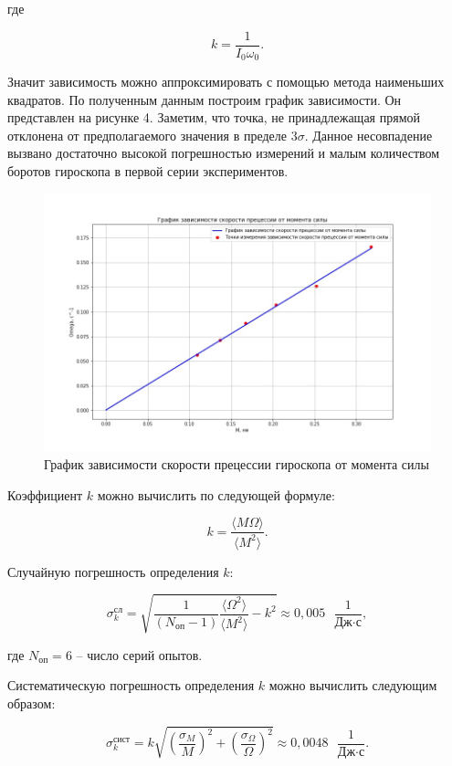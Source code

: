    где
    
\[
k = \frac{1}{I_0\omega_0}.
\]

    Значит зависимость можно аппроксимировать с помощью метода наименьших квадратов. По полученным данным построим график зависимости. Он представлен на рисунке 4. Заметим, что точка, не принадлежащая прямой отклонена от предполагаемого значения в пределе 3$\sigma$. Данное несовпадение вызвано достаточно высокой погрешностью измерений и малым количеством боротов гироскопа в первой серии экспериментов.

\begin{figure}[H]
	\includegraphics[scale = 0.45]{omegaM.jpg}
	\caption{График зависимости скорости прецессии гироскопа от момента силы}
	\label{graph}
\end{figure}

    Коэффициент $ k $ можно вычислить по следующей формуле:\label{k}

\[
k = \frac{\langle M\Omega\rangle}{\langle M^2 \rangle}.
\]

    Случайную погрешность определения $ k $:

\[
\sigma^\text{сл}_k = \sqrt{\frac{1}{{(N_\text{оп}-1)}} \frac{\langle \Omega^2 \rangle}{\langle M^2 \rangle} - k^2} \approx 0,005 \text{ } \frac{1}{\text{Дж} \cdot \text{с}},
\]

    где $ N_\text{оп} = 6 $ -- число серий опытов.

    Систематическую погрешность определения $ k $ можно вычислить следующим образом:

\[
\sigma^\text{сист}_k = k\sqrt{\left( \frac{\sigma_M}{M} \right)^2+\left(\frac{\sigma_\Omega}{\Omega} \right)^2} \approx 0,0048 \text{ } \frac{1}{\text{Дж} \cdot \text{с}}.
\]

